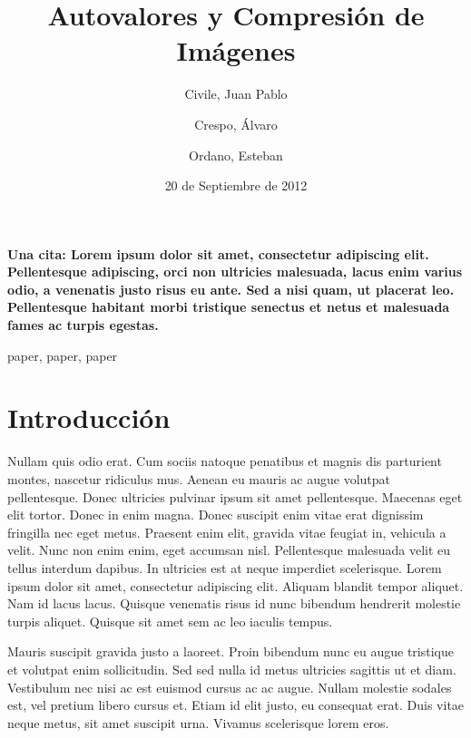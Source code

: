 \documentclass[twocolumn,a4paper,10pt]{article}
\title{Autovalores y Compresión de Imágenes}
\date{20 de Septiembre de 2012}
\author{Civile, Juan Pablo \and Crespo, Álvaro \and Ordano, Esteban }
\begin{document}
\pagestyle{fancy}
\maketitle
\thispagestyle{fancy}

\begin{customabstract}
\textbf{Una cita: \cite{PHPBuch} Lorem ipsum dolor sit amet, consectetur adipiscing elit. Pellentesque adipiscing, orci non ultricies malesuada, lacus enim varius odio, a venenatis justo risus eu ante. Sed a nisi quam, ut placerat leo. Pellentesque habitant morbi tristique senectus et netus et malesuada fames ac turpis egestas.}
\end{customabstract}

\begin{keywords}
paper, paper, paper
\end{keywords}


\section{Introducci\'on}

    Nullam quis odio erat. Cum sociis natoque penatibus et magnis dis parturient montes, nascetur ridiculus mus. Aenean eu mauris ac augue volutpat pellentesque. Donec ultricies pulvinar ipsum sit amet pellentesque. Maecenas eget elit tortor. Donec in enim magna. Donec suscipit enim vitae erat dignissim fringilla nec eget metus. Praesent enim elit, gravida vitae feugiat in, vehicula a velit. Nunc non enim enim, eget accumsan nisl. Pellentesque malesuada velit eu tellus interdum dapibus. In ultricies est at neque imperdiet scelerisque. Lorem ipsum dolor sit amet, consectetur adipiscing elit. Aliquam blandit tempor aliquet. Nam id lacus lacus. Quisque venenatis risus id nunc bibendum hendrerit molestie turpis aliquet. Quisque sit amet sem ac leo iaculis tempus.

    Mauris suscipit gravida justo a laoreet. Proin bibendum nunc eu augue tristique et volutpat enim sollicitudin. Sed sed nulla id metus ultricies sagittis ut et diam. Vestibulum nec nisi ac est euismod cursus ac ac augue. Nullam molestie sodales est, vel pretium libero cursus et. Etiam id elit justo, eu consequat erat. Duis vitae neque metus, sit amet suscipit urna. Vivamus scelerisque lorem eros.
\end{document}
